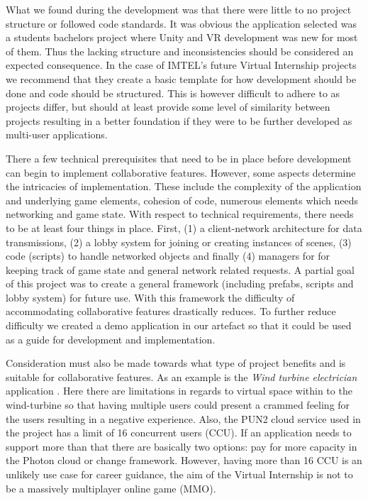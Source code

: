 What we found during the development was that there were little to no project structure or followed code standards. It was obvious the application selected was a students bachelors project where Unity and VR development was new for most of them. Thus the lacking structure and inconsistencies should be considered an expected consequence. In the case of IMTEL's future Virtual Internship projects we recommend that they create a basic template for how development should be done and code should be structured. This is however difficult to adhere to as projects differ, but should at least provide some level of similarity between projects resulting in a better foundation if they were to be further developed as multi-user applications.    

There a few technical prerequisites that need to be in place before development can begin to implement collaborative features. However, some aspects determine the intricacies of implementation. These include the complexity of the application and underlying game elements, cohesion of code, numerous elements which needs networking and game state. With respect to technical requirements, there needs to be at least four things in place. First, (1) a  client-network architecture for data transmissions, (2) a lobby system for joining or creating instances of scenes, (3) code (scripts) to handle networked objects and finally (4) managers for for keeping track of game state and general network related requests.
A partial goal of this project was to create a general framework (including prefabs, scripts and lobby system) for future use. With this framework the difficulty of accommodating collaborative features drastically reduces. To further reduce difficulty we created a demo application in our artefact so that it could be used as a guide for development and implementation.    

Consideration must also be made towards what type of project benefits and is suitable for collaborative features. As an example is the \textit{Wind turbine electrician} application \cite{henrichsen2019engaging}. Here there are limitations in regards to virtual space within to the wind-turbine so that having multiple users could present a crammed feeling for the users resulting in a negative experience. Also, the PUN2 cloud service used in the project has a limit of 16 concurrent users (CCU). If an application needs to support more than that there are basically two options: pay for more capacity in the Photon cloud or change framework. However, having more than 16 CCU is an unlikely use case for career guidance, the aim of the Virtual Internship is not to be a massively multiplayer online game (MMO).          

